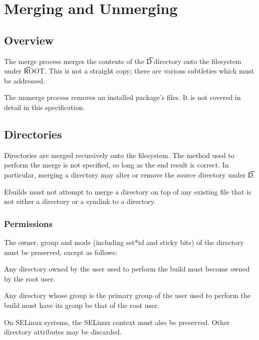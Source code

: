 \chapter{Merging and Unmerging}


\section{Overview}

The merge process merges the contents of the \t{D} directory onto the filesystem under \t{ROOT}.
This is not a straight copy; there are various subtleties which must be addressed.

The unmerge process removes an installed package's files. It is not covered in detail in this
specification.

\section{Directories}

Directories are merged recursively onto the filesystem. The method used to perform the merge is not
specified, so long as the end result is correct. In particular, merging a directory may alter or
remove the source directory under \t{D}.

Ebuilds must not attempt to merge a directory on top of any existing file that is not either a
directory or a symlink to a directory.

\subsection{Permissions}

The owner, group and mode (including set*id and sticky bits) of the directory must be preserved,
except as follows:

\begin{compactitem}
\item Any directory owned by the user used to perform the build must become owned by the root user.
\item Any directory whose group is the primary group of the user used to perform the build must have
    its group be that of the root user.
\end{compactitem}

On SELinux systems, the SELinux context must also be preserved. Other directory attributes may be discarded.

